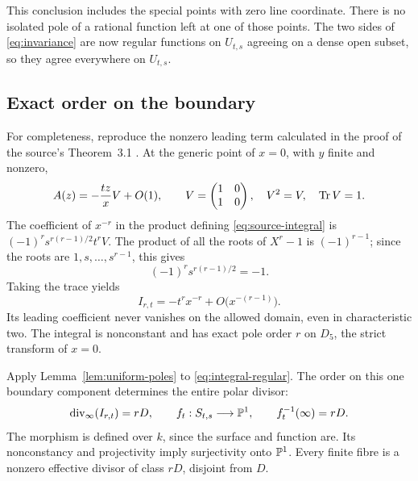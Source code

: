 This conclusion includes the special points with zero line coordinate.
There is no isolated pole of a rational function left at one of those
points. The two sides of \eqref{eq:invariance} are now regular
functions on \(U_{t,s}\) agreeing on a dense open subset, so they
agree everywhere on \(U_{t,s}\).

\subsection{Exact order on the boundary}

For completeness, reproduce the nonzero leading term calculated in
the proof of the source's Theorem~3.1 \citep{JoshiRoffelsen2026}.
At the generic point of \(x=0\), with \(y\) finite and nonzero,
\begin{equation}\label{eq:idempotent-leading}
A(z)=-\frac{tz}{x}V+O(1),\qquad
V=\begin{pmatrix}1&0\\1&0\end{pmatrix},\quad
V^2=V,\quad\operatorname{Tr} V=1.
\end{equation}
The coefficient of \(x^{-r}\) in the product defining
\eqref{eq:source-integral} is
\((-1)^rs^{r(r-1)/2}t^rV\). The product of all the roots
of \(X^r-1\) is \((-1)^{r-1}\); since the roots are
\(1,s,\ldots,s^{r-1}\), this gives
\[
(-1)^rs^{r(r-1)/2}=-1.
\]
Taking the trace yields
\begin{equation}\label{eq:nonzero-leading}
I_{r,t}=-t^rx^{-r}+O\bigl(x^{-(r-1)}\bigr).
\end{equation}
Its leading coefficient never vanishes on the allowed domain, even
in characteristic two. The integral is nonconstant and has exact
pole order \(r\) on \(D_5\), the strict transform of \(x=0\).

Apply Lemma~\ref{lem:uniform-poles} to
\eqref{eq:integral-regular}. The order on this one boundary component
determines the entire polar divisor:
\begin{equation}\label{eq:exact-fibration}
\operatorname{div}_{\infty}(I_{r,t})=rD,\qquad
f_t:S_{t,s}\longrightarrow\mathbb P^1,\qquad
f_t^{-1}(\infty)=rD.
\end{equation}
The morphism is defined over \(k\), since the surface and function
are. Its nonconstancy and projectivity imply surjectivity onto
\(\mathbb P^1\). Every finite fibre is a nonzero effective divisor
of class \(rD\), disjoint from \(D\).
